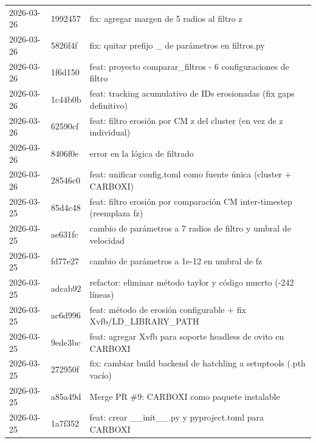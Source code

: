 \documentclass[12pt,a4paper]{article}
\begin{document}
\begin{longtable}{@{}llp{10cm}@{}}
	2026-03-26     & 1992457         & fix: agregar margen de 5 radios al filtro z                                          \\
	2026-03-26     & 5826f4f         & fix: quitar prefijo \_ de parámetros en filtros.py                                   \\
	2026-03-26     & 1f6d150         & feat: proyecto comparar\_filtros - 6 configuraciones de filtro                       \\
	2026-03-26     & 1c44b0b         & feat: tracking acumulativo de IDs erosionadas (fix gaps definitivo)                  \\
	2026-03-26     & 62590cf         & feat: filtro erosión por CM z del cluster (en vez de z individual)                   \\
	2026-03-26     & 8406f0e         & error en la lógica de filtrado                                                       \\
	2026-03-26     & 28546c0         & feat: unificar config.toml como fuente única (cluster + CARBOXI)                     \\
	2026-03-25     & 85d4c48         & feat: filtro erosión por comparación CM inter-timestep (reemplaza fz)                \\
	2026-03-25     & ae631fc         & cambio de parámetros a 7 radios de filtro y umbral de velocidad                      \\
	2026-03-25     & fd77e27         & cambio de parámetros a 1e-12 en umbral de fz                                         \\
	2026-03-25     & adcab92         & refactor: eliminar método taylor y código muerto (-242 líneas)                       \\
	2026-03-25     & ac6d996         & feat: método de erosión configurable + fix Xvfb/LD\_LIBRARY\_PATH                    \\
	2026-03-25     & 9ede3bc         & feat: agregar Xvfb para soporte headless de ovito en CARBOXI                         \\
	2026-03-25     & 272950f         & fix: cambiar build backend de hatchling a setuptools (.pth vacío)                    \\
	2026-03-25     & a85a49d         & Merge PR \#9: CARBOXI como paquete instalable                                        \\
	2026-03-25     & 1a7f352         & feat: crear \_\_init\_\_.py y pyproject.toml para CARBOXI                            \\

\end{longtable}
\end{document}
